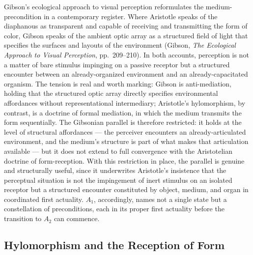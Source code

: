 Gibson's ecological approach to visual perception reformulates the medium-precondition in a contemporary register. Where Aristotle speaks of the diaphanous as transparent and capable of receiving and transmitting the form of color, Gibson speaks of the ambient optic array as a structured field of light that specifies the surfaces and layouts of the environment (Gibson, \textit{The Ecological Approach to Visual Perception}, pp.~209--210). In both accounts, perception is not a matter of bare stimulus impinging on a passive receptor but a structured encounter between an already-organized environment and an already-capacitated organism. The tension is real and worth marking: Gibson is anti-mediation, holding that the structured optic array directly specifies environmental affordances without representational intermediary; Aristotle's hylomorphism, by contrast, is a doctrine of formal mediation, in which the medium transmits the form sequentially. The Gibsonian parallel is therefore restricted: it holds at the level of structural affordances --- the perceiver encounters an already-articulated environment, and the medium's structure is part of what makes that articulation available --- but it does not extend to full convergence with the Aristotelian doctrine of form-reception. With this restriction in place, the parallel is genuine and structurally useful, since it underwrites Aristotle's insistence that the perceptual situation is not the impingement of inert stimulus on an isolated receptor but a structured encounter constituted by object, medium, and organ in coordinated first actuality. $A_1$, accordingly, names not a single state but a constellation of preconditions, each in its proper first actuality before the transition to $A_2$ can commence.

\subsection{Hylomorphism and the Reception of Form}


